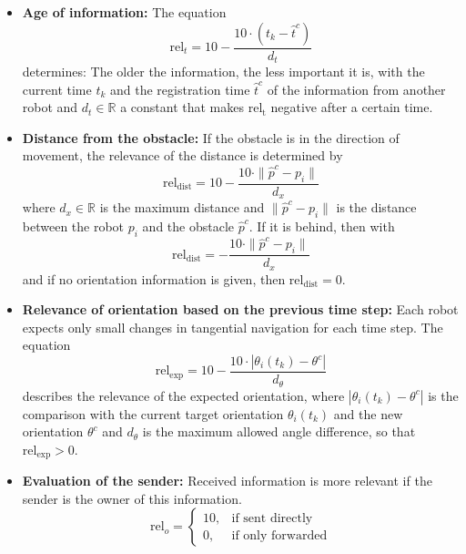 \documentclass[conference]{IEEEtran}
\begin{document}
\begin{itemize}
    \item \textbf{Age of information:}
    The equation
    \begin{equation}
        \mathrm{rel}_t = 10 - \frac{10 \cdot (t_k - \hat{t}^c)}{d_t}
        \label{eq:5}
    \end{equation}
    determines: The older the information, the less important it is, with 
    the current time \( t_k \) and the registration time \( \hat{t}^c \) of the information from another 
    robot and \( d_t \in \mathbb{R} \) a constant that makes \( \mathrm{rel_t} \) negative after a
    certain time.
    
    \item \textbf{Distance from the obstacle:}
    If the obstacle is in the direction of movement, 
    the relevance of the distance is determined by 
    \begin{equation}
        \mathrm{rel}_{\mathrm{dist}} = 10 - \frac{10 \cdot \| \hat{p}^c - p_i \|}{d_x}
        \label{eq:6}
    \end{equation}
    where \( d_x \in \mathbb{R} \) is the maximum distance and \( \| \hat{p}^c - p_i \| \) is the distance between the robot $p_i$ 
    and the obstacle $\hat{p}^c$. If it is behind, then with
    \begin{equation}
        \mathrm{rel}_{\mathrm{dist}} = - \frac{10 \cdot \| \hat{p}^c - p_i \|}{d_x}
        \label{eq:7}
    \end{equation}
    and if no orientation information is given, then 
    \( \mathrm{rel}_{\mathrm{dist}} = 0 \).
    
    \item \textbf{Relevance of orientation based on the previous time step:}
    Each robot expects only small changes in tangential 
    navigation for each time step. The equation 
    \begin{equation}
        \mathrm{rel}_{\mathrm{exp}} = 10 - \frac{10 \cdot | \theta_i(t_k) - \theta^c |}{d_\theta}
        \label{eq:8}
    \end{equation}
    describes the relevance of the expected orientation, where 
    \( |\theta_i(t_k) - \theta^c| \) is the comparison with the current target orientation $\theta_i(t_k)$ and 
    the new orientation $\theta^c$ and \( d_\theta \) is the maximum allowed angle difference, so that
    \( \mathrm{rel}_{\mathrm{exp}} > 0 \).
    
    \item \textbf{Evaluation of the sender:}
    Received information is more relevant if the sender is the owner of this information.
    \begin{equation}
        \mathrm{rel}_o =
        \begin{cases}
        10, & \text{if sent directly}\\
        0, & \text{if only forwarded}
        \end{cases}
        \label{eq:9}
    \end{equation}
    

\end{itemize}
\end{document}
